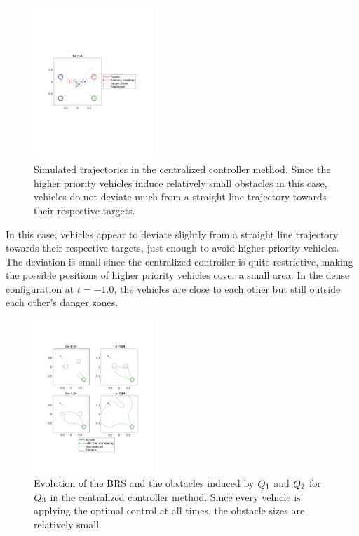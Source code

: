 \begin{figure}
  \centering
  \includegraphics[width=0.40\textwidth]{"fig/cc_traj"}
  \caption{Simulated trajectories in the centralized controller method. Since the higher priority vehicles induce relatively small obstacles in this case, vehicles do not deviate much from a straight line trajectory towards their respective targets.}
  \label{fig:cc_traj}
  \vspace{-1.4em}
\end{figure}

In this case, vehicles appear to deviate slightly from a straight line trajectory towards their respective targets, just enough to avoid higher-priority vehicles. The deviation is small since the centralized controller is quite restrictive, making the possible positions of higher priority vehicles cover a small area. In the dense configuration at $t=-1.0$, the vehicles are close to each other but still outside each other's danger zones.

\begin{figure}[h]
  \centering
  \includegraphics[width=0.40\textwidth]{"fig/cc_rs3"}
  \caption{Evolution of the BRS and the obstacles induced by $Q_{1}$ and $Q_{2}$ for $Q_{3}$ in the centralized controller method. Since every vehicle is applying the optimal control at all times, the obstacle sizes are relatively small.}
  \label{fig:cc_rs3}
  \vspace{-1.2em}
\end{figure}

